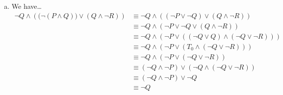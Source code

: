 \documentclass[12pt,letterpaper]{exam}
\begin{document}
\begin{questions}
\begin{enumerate}[(a)]
\[\begin{tikzpicture}
	\draw[line width= 0.03cm] (r) |- (not1.input); %
	\draw[line width= 0.03cm] (q) -- (1.2,2) |- (and1.input 1); %
	\draw[line width= 0.03cm] (not1) -- ([xshift=0.5cm]not1.output) |- (and1.input 2); %
	\draw[line width= 0.03cm] (1.2,2) |- (not2.input); %
	\draw[line width= 0.03cm] (p) |- (and2.input 1); %
	\draw[line width= 0.03cm] (1.2,2) |- (and2.input 2); %
	\draw[line width= 0.03cm] (and2.output) |- (not3.input); %
	\draw[line width= 0.03cm] (and1.output) -- ([xshift=0.6cm]and1.output) |- (or1.input 2); %
	\draw[line width= 0.03cm] (not3.output) -- ([xshift=0.3cm]not3.output) |- (or1.input 1); %
	\draw[line width= 0.03cm] (or1.output) -- ([xshift=0.6cm]or1.output) |- (and3.input 2); %
	\draw[line width= 0.03cm] (not2.output) -- (4.16,2.8) to[crossing] (4.4,2.8) |- (and3.input 1); %
	\draw[line width= 0.03cm] (and3.output) -- ([xshift=0.6cm]and3.output); %
	
	\node at (1.5,4.35) {\scriptsize $P$}; 
	\node at (1.5, 3.75) {\scriptsize $Q$};
	\node at (1.5, 3) {\scriptsize $Q$};
	\node at (0.4, -0.2) {\scriptsize $R$};
	\node at (1.9,-0.2) {\scriptsize $\neg R$};
	\node at (2.2, 2.2) {\scriptsize $Q$};
	
	\node at (2.25, 1.4) {\scriptsize $\neg R$};
	\node at (2.9, 4.35) {\scriptsize $P \wedge Q$};
	\node at (2.9, 3) {\scriptsize $\neg Q$};
	\node at (3.9, 1.7) {\scriptsize $Q \wedge \neg R$};
	
	\node at (4.55, 4.25) {\scriptsize $\neg (P \wedge Q)$};
	
	\node at (7,1.8) {\scriptsize $\big( \neg (P \wedge Q) \big) \vee (Q \wedge \neg R)$};
	\node at (10.3,2.7) {\scriptsize $\neg Q \wedge \left( \big( \neg (P \wedge Q) \big) \vee (Q \wedge \neg R) \right)$};
	\end{tikzpicture}
	\] \pspace

\item We have\dots
	\[
	\begin{aligned}
	\neg Q \wedge \left( \big( \neg (P \wedge Q) \big) \vee (Q \wedge \neg R) \right)&\equiv \neg Q \wedge \left( (\neg P \vee \neg Q) \vee (Q \wedge \neg R) \right) \\
	&\equiv \neg Q \wedge \left( \neg P \vee \neg Q \vee (Q \wedge \neg R) \right) \\
	&\equiv \neg Q \wedge \left( \neg P \vee \left( (\neg Q \vee Q) \wedge (\neg Q \vee \neg R) \right) \right) \\
	&\equiv \neg Q \wedge \left(\neg P \vee \left( T_0 \wedge (\neg Q \vee \neg R) \right) \right) \\
	&\equiv \neg Q \wedge \left(\neg P \vee (\neg Q \vee \neg R) \right) \\
	&\equiv (\neg Q \wedge \neg P) \vee \left(\neg Q \wedge (\neg Q \vee \neg R) \right) \\
	&\equiv (\neg Q \wedge \neg P) \vee \neg Q \\
	&\equiv \neg Q
	\end{aligned}
	\] \pspace


\end{enumerate}
\end{questions}
\end{document}

